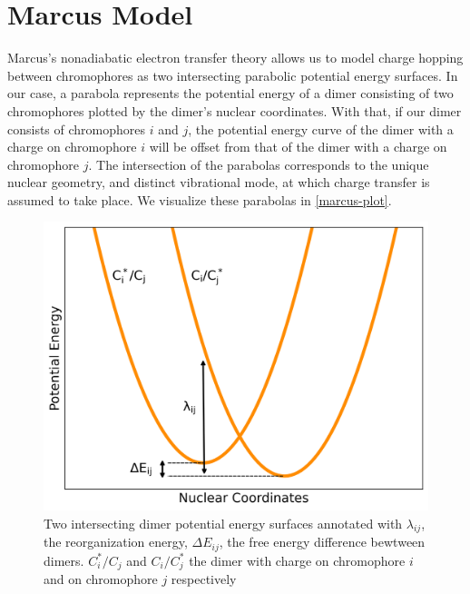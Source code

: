 \section{Marcus Model}
\label{marcusmodel}

Marcus's nonadiabatic electron transfer theory allows us to model charge hopping between chromophores as two
intersecting parabolic potential energy surfaces. 
In our case, a parabola represents the potential energy of a dimer consisting of two chromophores plotted by 
the dimer's nuclear coordinates. 
With that, if our dimer consists of chromophores $i$ and $j$, the potential energy curve of the dimer with a
charge on chromophore $i$ will be offset from that of the dimer with a charge on chromophore $j$. The
intersection of the parabolas corresponds to the unique nuclear geometry, and distinct vibrational mode, at
which charge transfer is assumed to take place. We visualize these parabolas in \autoref{marcus-plot}.
\begin{figure}
  \center
  \includegraphics[width=0.99\linewidth]{figures/marcus-plot.png} 
    \caption{Two intersecting dimer potential energy surfaces annotated with $\lambda_{ij}$, the
    reorganization energy, $\Delta E_{ij}$, the free energy difference bewtween dimers. $C_{i}^*/C_{j}$ 
    and $C_{i}/C_{j}^*$ the dimer with charge on chromophore $i$ and on chromophore $j$ respectively}
  \label{marcus-plot}
\end{figure}

